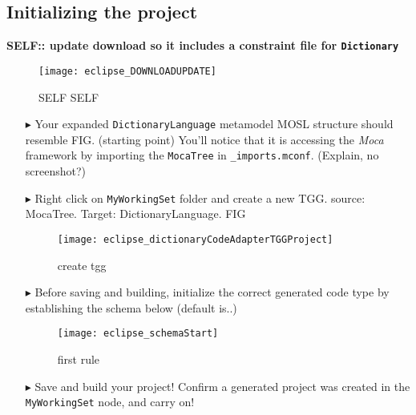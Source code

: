 \newpage
\hypertarget{M2TSettingUp tex}{}
\subsection{Initializing the project}
\texHeader

{\bf SELF:: update download so it includes a constraint file for \texttt{Dictionary}}
\begin{figure}[htbp]
\begin{center}
  \texttt{[image: eclipse\_DOWNLOADUPDATE]}
  \caption{SELF SELF}
\end{center}
\end{figure}

\begin{enumerate}

\item[$\blacktriangleright$] Your expanded \texttt{DictionaryLanguage} metamodel MOSL structure should resemble FIG. (starting point) You'll notice that it is
accessing the \emph{Moca} framework by importing the \texttt{MocaTree} in \texttt{\_imports.mconf}. (Explain, no screenshot?)

\item[$\blacktriangleright$] Right click on \texttt{MyWorkingSet} folder and create a new TGG. source: MocaTree. Target: DictionaryLanguage. FIG

\begin{figure}[htbp]
\begin{center}
  \texttt{[image: eclipse\_dictionaryCodeAdapterTGGProject]}
  \caption{create tgg}
  \label{eclipse:newTGGProject}
\end{center}
\end{figure}


\item[$\blacktriangleright$] Before saving and building, initialize the correct generated code type by establishing the schema below (default is..)

\begin{figure}[htbp]
\begin{center}
  \texttt{[image: eclipse\_schemaStart]}
  \caption{first rule}
  \label{eclipse:firstSchema}
\end{center}
\end{figure}

\item[$\blacktriangleright$] Save and build your project! Confirm a generated project was created in the \texttt{MyWorkingSet} node, and carry on!

\end{enumerate}
